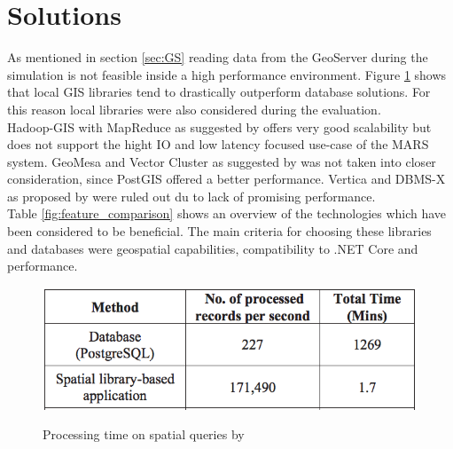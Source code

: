 \section{Solutions}
As mentioned in section \ref{sec:GS} reading data from the GeoServer during the simulation is not feasible inside a high performance environment. Figure \ref{img:spatial-queries} shows that local GIS libraries tend to drastically outperform database solutions. For this reason local libraries were also considered during the evaluation.\\
Hadoop-GIS with MapReduce as suggested by \cite{Wang2011} offers very good scalability but does not support the hight IO and low latency focused use-case of the MARS system.  GeoMesa and Vector Cluster as suggested by \cite{Toups2016} was not taken into closer consideration, since PostGIS offered a better performance. Vertica and DBMS-X as proposed by \cite{Pavlo2009} were ruled out du to lack of promising performance. \\
Table \ref{fig:feature_comparison} shows an overview of the technologies which have been considered to be beneficial. The main criteria for choosing these libraries and databases were geospatial capabilities, compatibility to .NET Core and performance.

\begin{figure}[H]
	\centering
	\includegraphics[width=0.6\columnwidth]{res/spatial-queries}\\
	\caption[]{Processing time on spatial queries by \cite{Witayangkurn2012}}
	\label{img:spatial-queries}
\end{figure}


